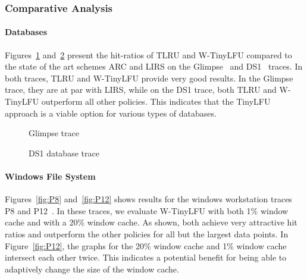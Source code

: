 \documentclass[10pt,a4paper]{article}
\begin{document}
\subsubsection{Comparative Analysis}
\label{sec:comparing}

\paragraph*{Databases}
Figures~\ref{fig:glimpse} and~\ref{fig:ds1} present the hit-ratios of TLRU and W-TinyLFU compared to the state of the art schemes ARC and LIRS on the Glimpse~\cite{LIRS} and DS1~\cite{ARC} traces.
In both traces, TLRU and W-TinyLFU provide very good results.
In the Glimpse trace, they are at par with LIRS, while on the DS1 trace, both TLRU and W-TinyLFU outperform all other policies.
This indicates that the TinyLFU approach is a viable option for various types of databases.
\begin{figure}[t]
	\caption{Glimpse trace}
	\label{fig:glimpse}
\end{figure}
\begin{figure}[t]
	\caption{DS1 database trace}
	\label{fig:ds1}
\end{figure}

\begin{comment}
\paragraph*{Wikipedia}
Our next evaluation in Figure~\ref{fig:wiki} is of the Wikipedia trace~\cite{WikiTrace}.
As can be seen, for the Wikipedia trace W-TinyLFU provides the same good results as ARC and LIRS, with TLRU exhibiting slightly lower hit-ratios.

\begin{figure}[t]
	\center{
		\texttt{[image: wikipeida.pdf]}
    }
	\caption{Wikipedia trace}
	\label{fig:wiki}
\end{figure}
\end{comment}

\paragraph*{Windows File System}
Figures~\ref{fig:P8} and~\ref{fig:P12} shows results for the windows workstation traces P8 and P12~\cite{ARC}.
In these traces, we evaluate W-TinyLFU with both 1\% window cache and with a 20\% window cache.
As shown, both achieve very attractive hit ratios and outperform the other policies for all but the largest data points.
In Figure~\ref{fig:P12}, the graphs for the 20\% window cache and 1\% window cache intersect each other twice.
This indicates a potential benefit for being able to adaptively change the size of the window cache.
\end{document}
